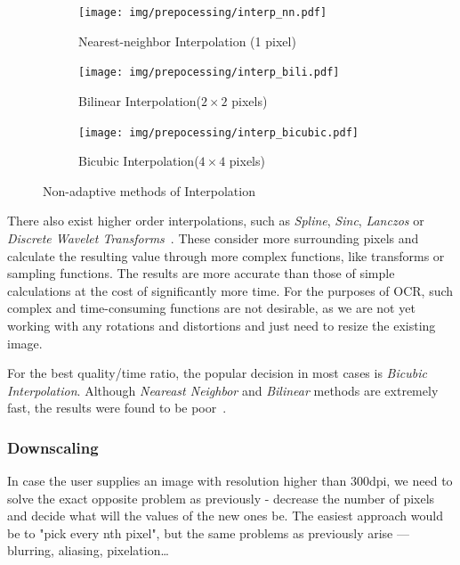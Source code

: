 \begin{figure}[H]
\hspace*{\fill} %
\begin{subfigure}{0.31\textwidth}
\texttt{[image: img/prepocessing/interp\_nn.pdf]}
\caption{Nearest-neighbor Interpolation (1 pixel)} \label{fig:1a}
\end{subfigure}
\hspace*{\fill} %
\begin{subfigure}{0.31\textwidth}
\texttt{[image: img/prepocessing/interp\_bili.pdf]}
\caption{Bilinear Interpolation($2\times2$ pixels)} \label{fig:1b}
\end{subfigure}
\hspace*{\fill} %
\begin{subfigure}{0.31\textwidth}
\texttt{[image: img/prepocessing/interp\_bicubic.pdf]}
\caption{Bicubic Interpolation($4\times4$ pixels)} \label{fig:1c}
\end{subfigure}
\caption{Non-adaptive methods of Interpolation} \label{fig:1}
\end{figure}

There also exist higher order interpolations, such as \emph{Spline}, \emph{Sinc}, \emph{Lanczos} or \emph{Discrete Wavelet Transforms}~\cite{interpolation}. These consider more surrounding pixels and calculate the resulting value through more complex functions, like transforms or sampling functions. The results are more accurate than those of simple calculations at the cost of significantly more time. For the purposes of OCR, such complex and time-consuming functions are not desirable, as we are not yet working with any rotations and distortions and just need to resize the existing image.

For the best quality/time ratio, the popular decision in most cases is \emph{Bicubic Interpolation}. Although \emph{Neareast Neighbor} and \emph{Bilinear} methods are extremely fast, the results were found to be poor~\cite{interpolationComp}.

\subsubsection{Downscaling}

In case the user supplies an image with resolution higher than 300dpi, we need to solve the exact opposite problem as previously - decrease the number of pixels and decide what will the values of the new ones be. The easiest approach would be to "pick every nth pixel", but the same problems as previously arise --- blurring, aliasing, pixelation\ldots

